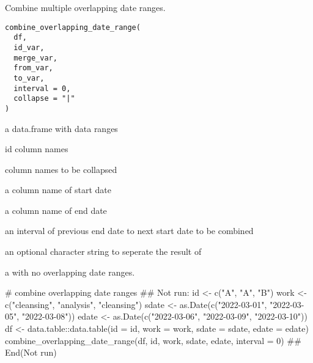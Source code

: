 \documentclass[letterpaper]{book}
\begin{document}
%
\begin{Description}
Combine multiple overlapping date ranges.
\end{Description}
%
\begin{Usage}
\begin{verbatim}
combine_overlapping_date_range(
  df,
  id_var,
  merge_var,
  from_var,
  to_var,
  interval = 0,
  collapse = "|"
)
\end{verbatim}
\end{Usage}
%
\begin{Arguments}
\begin{ldescription}
\item[\code{df}] a data.frame with data ranges

\item[\code{id\_var}] id column names

\item[\code{merge\_var}] column names to be collapsed

\item[\code{from\_var}] a column name of start date

\item[\code{to\_var}] a column name of end date

\item[\code{interval}] an interval of previous end date to next start date to be combined

\item[\code{collapse}] an optional character string to seperate the result of 
\end{ldescription}
\end{Arguments}
%
\begin{Value}
a  with no overlapping date ranges.
\end{Value}
%
\begin{Examples}
\begin{ExampleCode}
# combine overlapping date ranges
## Not run: 
id <- c("A", "A", "B")
work <- c("cleansing", "analysis", "cleansing")
sdate <- as.Date(c("2022-03-01", "2022-03-05", "2022-03-08"))
edate <- as.Date(c("2022-03-06", "2022-03-09", "2022-03-10"))
df <- data.table::data.table(id = id, work = work, sdate = sdate, edate = edate)
combine_overlapping_date_range(df, id, work, sdate, edate, interval = 0)
## End(Not run)

\end{ExampleCode}
\end{Examples}
\end{document}
